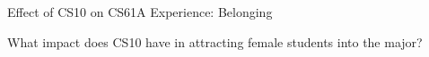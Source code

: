\documentclass{beamer}                  %
\begin{document}
\begin{frame}{Effect of CS10 on CS61A Experience: Belonging}

  \begin{figure}[!htbp]
      \centering 

  \end{figure}

\end{frame}


\begin{frame}{What impact does CS10 have in attracting female students into the major?}

  \begin{figure}[!htbp]
      \centering
        
  \end{figure}

\end{frame}



\clearpage
\end{document}
